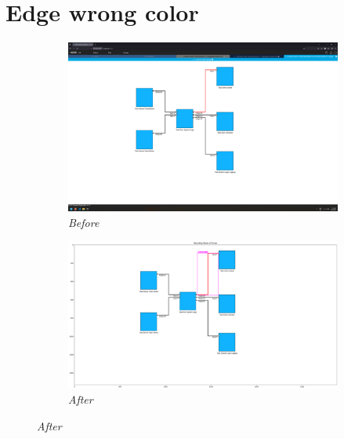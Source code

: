 \documentclass{article}
\begin{document}
\section{Edge wrong color}
\begin{figure}[H]
    \centering
    \begin{subfigure}[t]{0.9\textwidth}
        \centering
        \includegraphics[width=\textwidth]{testcases/edge_wrong_color/145759-936864_input_image.png}
        \caption*{\textit{Before}}
    \end{subfigure}
    \newline    
    \begin{subfigure}[t]{0.9\textwidth}
        \centering
        \includegraphics[width=\textwidth]{testcases/edge_wrong_color/145820-255866_element_bbox_errors_labeled_colored.png}
        \caption*{\textit{After}}
    \end{subfigure}
    \label{fig:edge_wrong_color}
\end{figure}
\newpage
\end{document}
